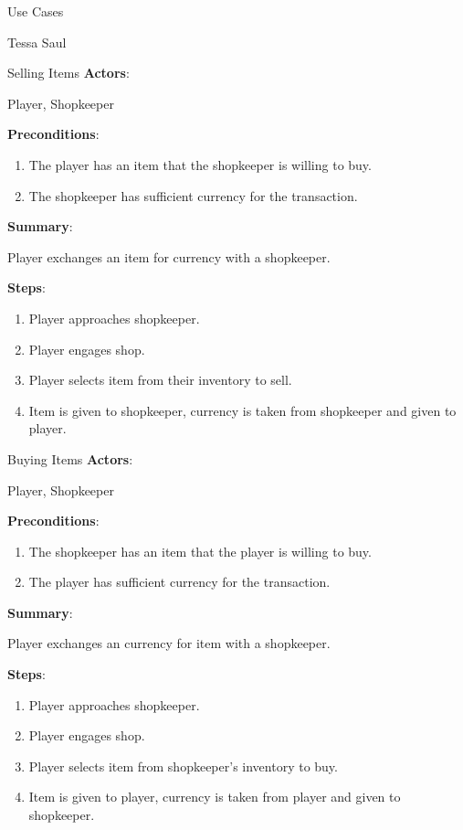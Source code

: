 \documentclass[12pt]{report}
\begin{document}
\begin{section}{Use Cases}
\begin{subsection}{Tessa Saul}
\begin{subsubsection}{Selling Items}
\textbf{Actors}:

Player, Shopkeeper

\textbf{Preconditions}:

\begin{enumerate}
\item The player has an item that the shopkeeper is willing to buy.
\item The shopkeeper has sufficient currency for the transaction.
\end{enumerate}

\textbf{Summary}:

Player exchanges an item for currency with a shopkeeper.

\textbf{Steps}:
 
\begin{enumerate}
\item Player approaches shopkeeper.
\item Player engages shop.
\item Player selects item from their inventory to sell.
\item Item is given to shopkeeper, currency is taken from shopkeeper and
given to player.
\end{enumerate}
\end{subsubsection}

\begin{subsubsection}{Buying Items}
\textbf{Actors}:

Player, Shopkeeper

\textbf{Preconditions}:

\begin{enumerate}
\item The shopkeeper has an item that the player is willing to buy.
\item The player has sufficient currency for the transaction.
\end{enumerate}

\textbf{Summary}:

Player exchanges an currency for item with a shopkeeper.

\textbf{Steps}:
 
\begin{enumerate}
\item Player approaches shopkeeper.
\item Player engages shop.
\item Player selects item from shopkeeper's inventory to buy.
\item Item is given to player, currency is taken from player and given to
shopkeeper.
\end{enumerate}
\end{subsubsection}


\end{subsection}
\end{section}
\end{document}
